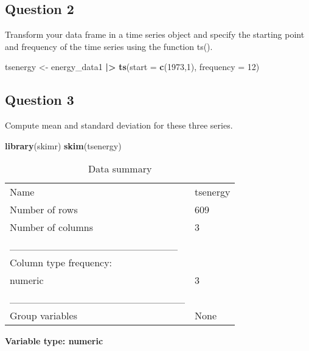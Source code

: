 \documentclass[
]{article}
\newenvironment{Shaded}{\begin{snugshade}}{\end{snugshade}}
\newcommand{\AttributeTok}[1]{\textcolor[rgb]{0.13,0.29,0.53}{#1}}
\newcommand{\DecValTok}[1]{\textcolor[rgb]{0.00,0.00,0.81}{#1}}
\newcommand{\FunctionTok}[1]{\textcolor[rgb]{0.13,0.29,0.53}{\textbf{#1}}}
\newcommand{\NormalTok}[1]{#1}
\newcommand{\OtherTok}[1]{\textcolor[rgb]{0.56,0.35,0.01}{#1}}
\newcommand{\SpecialCharTok}[1]{\textcolor[rgb]{0.81,0.36,0.00}{\textbf{#1}}}
\begin{document}
\hypertarget{question-2}{%
\subsection{Question 2}\label{question-2}}

Transform your data frame in a time series object and specify the
starting point and frequency of the time series using the function ts().

\begin{Shaded}
\begin{Highlighting}[]
\NormalTok{tsenergy }\OtherTok{\textless{}{-}}\NormalTok{ energy\_data1 }\SpecialCharTok{|\textgreater{}}
  \FunctionTok{ts}\NormalTok{(}\AttributeTok{start =} \FunctionTok{c}\NormalTok{(}\DecValTok{1973}\NormalTok{,}\DecValTok{1}\NormalTok{), }\AttributeTok{frequency =} \DecValTok{12}\NormalTok{)}
\end{Highlighting}
\end{Shaded}

\hypertarget{question-3}{%
\subsection{Question 3}\label{question-3}}

Compute mean and standard deviation for these three series.

\begin{Shaded}
\begin{Highlighting}[]
\FunctionTok{library}\NormalTok{(skimr)}
\FunctionTok{skim}\NormalTok{(tsenergy) }
\end{Highlighting}
\end{Shaded}

\begin{longtable}[]{@{}ll@{}}
\caption{Data summary}\tabularnewline
\toprule\noalign{}
\endfirsthead
\endhead
\bottomrule\noalign{}
\endlastfoot
Name & tsenergy \\
Number of rows & 609 \\
Number of columns & 3 \\
\_\_\_\_\_\_\_\_\_\_\_\_\_\_\_\_\_\_\_\_\_\_\_ & \\
Column type frequency: & \\
numeric & 3 \\
\_\_\_\_\_\_\_\_\_\_\_\_\_\_\_\_\_\_\_\_\_\_\_\_ & \\
Group variables & None \\
\end{longtable}

\textbf{Variable type: numeric}
\end{document}
